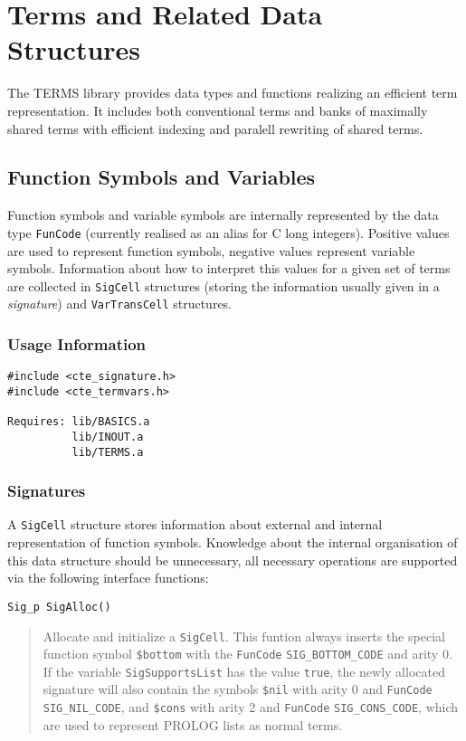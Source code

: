 
\section{Terms and Related Data Structures}
\label{sec:terms}

The TERMS library provides data types and functions realizing an
efficient term representation. It includes both conventional terms and
banks of maximally shared terms with efficient indexing and paralell
rewriting of shared terms.

\subsection{Function Symbols and Variables}
\label{sec:terms:sigs}

Function symbols and variable symbols are internally represented by
the data type \texttt{FunCode} (currently realised as an alias for C
long integers). Positive values are used to represent function
symbols, negative values represent variable symbols. Information about
how to interpret this values for a given set of terms are collected in
\texttt{SigCell} structures (storing the information usually given in
a \emph{signature}) and \texttt{VarTransCell} structures.

\subsubsection{Usage Information}

\begin{verbatim}
#include <cte_signature.h>
#include <cte_termvars.h>

Requires: lib/BASICS.a
          lib/INOUT.a
          lib/TERMS.a
\end{verbatim}


\subsubsection{Signatures}
\label{sec:terms:sigs:sigs}

A \texttt{SigCell} structure stores information about external and
internal representation of function symbols. Knowledge about the
internal organisation of this data structure should be unnecessary,
all necessary operations are supported via the following interface
functions: 

\begin{verbatim}
Sig_p SigAlloc()
\end{verbatim}
\begin{quote}
  Allocate and initialize a \texttt{SigCell}. This funtion always
  inserts the special function symbol \verb-$bottom- with the \texttt{FunCode}
  \texttt{SIG\_BOTTOM\_CODE} and arity 0. If the variable
  \texttt{SigSupportsList} has the value \texttt{true}, the newly
  allocated signature will also contain the symbols \verb-$nil- with
  arity 0 and \texttt{FunCode} \texttt{SIG\_NIL\_CODE}, and \verb-$cons- with
  arity 2 and \texttt{FunCode} \texttt{SIG\_CONS\_CODE}, which are used to
  represent PROLOG lists as normal terms.
\end{quote}


